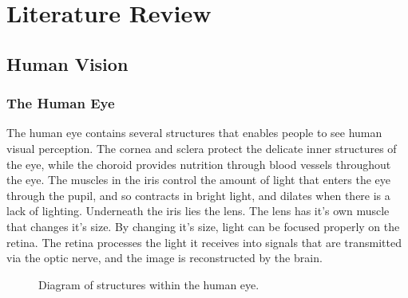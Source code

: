 \documentclass[12pt]{CPP}
\begin{document}
\newpage
\section{Literature Review}

\subsection{Human Vision}

\subsubsection{The Human Eye}
The human eye contains several structures that enables people to see human visual perception. The cornea and sclera protect the delicate inner structures of the eye, while the choroid provides nutrition through blood vessels throughout the eye. The muscles in the iris control the amount of light that enters the eye through the pupil, and so contracts in bright light, and dilates when there is a lack of lighting. Underneath the iris lies the lens. The lens has it's own muscle that changes it's size. By changing it's size, light can be focused properly on the retina. The retina processes the light it receives into signals that are transmitted via the optic nerve, and the image is reconstructed by the brain.

\begin{figure}[!htbp]
\begin{center}
\caption{Diagram of structures within the human eye.}
\end{center}
\end{figure}
\end{document}
